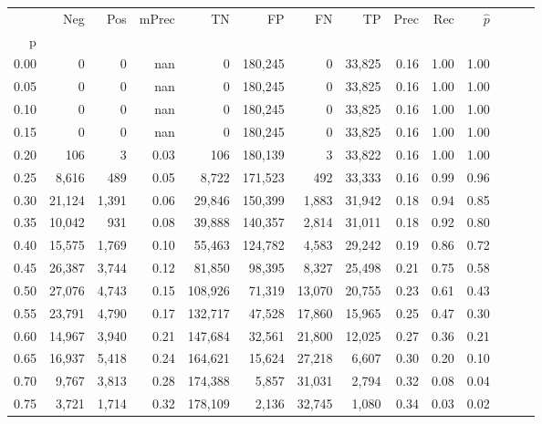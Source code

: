 \begin{tabular}{rrrrrrrrrrrrrr}
\toprule
{} &     Neg &    Pos & mPrec &       TN &       FP &      FN &      TP &  Prec &   Rec & $\hat{p}$ \\
p    &         &        &       &          &          &         &         &       &       &           \\
\midrule
0.00 &       0 &      0 &   nan &        0 &  180,245 &       0 &  33,825 &  0.16 &  1.00 &      1.00 \\
0.05 &       0 &      0 &   nan &        0 &  180,245 &       0 &  33,825 &  0.16 &  1.00 &      1.00 \\
0.10 &       0 &      0 &   nan &        0 &  180,245 &       0 &  33,825 &  0.16 &  1.00 &      1.00 \\
0.15 &       0 &      0 &   nan &        0 &  180,245 &       0 &  33,825 &  0.16 &  1.00 &      1.00 \\
0.20 &     106 &      3 &  0.03 &      106 &  180,139 &       3 &  33,822 &  0.16 &  1.00 &      1.00 \\
0.25 &   8,616 &    489 &  0.05 &    8,722 &  171,523 &     492 &  33,333 &  0.16 &  0.99 &      0.96 \\
0.30 &  21,124 &  1,391 &  0.06 &   29,846 &  150,399 &   1,883 &  31,942 &  0.18 &  0.94 &      0.85 \\
0.35 &  10,042 &    931 &  0.08 &   39,888 &  140,357 &   2,814 &  31,011 &  0.18 &  0.92 &      0.80 \\
0.40 &  15,575 &  1,769 &  0.10 &   55,463 &  124,782 &   4,583 &  29,242 &  0.19 &  0.86 &      0.72 \\
0.45 &  26,387 &  3,744 &  0.12 &   81,850 &   98,395 &   8,327 &  25,498 &  0.21 &  0.75 &      0.58 \\
0.50 &  27,076 &  4,743 &  0.15 &  108,926 &   71,319 &  13,070 &  20,755 &  0.23 &  0.61 &      0.43 \\
0.55 &  23,791 &  4,790 &  0.17 &  132,717 &   47,528 &  17,860 &  15,965 &  0.25 &  0.47 &      0.30 \\
0.60 &  14,967 &  3,940 &  0.21 &  147,684 &   32,561 &  21,800 &  12,025 &  0.27 &  0.36 &      0.21 \\
0.65 &  16,937 &  5,418 &  0.24 &  164,621 &   15,624 &  27,218 &   6,607 &  0.30 &  0.20 &      0.10 \\
0.70 &   9,767 &  3,813 &  0.28 &  174,388 &    5,857 &  31,031 &   2,794 &  0.32 &  0.08 &      0.04 \\
0.75 &   3,721 &  1,714 &  0.32 &  178,109 &    2,136 &  32,745 &   1,080 &  0.34 &  0.03 &      0.02 \\

\end{tabular}
